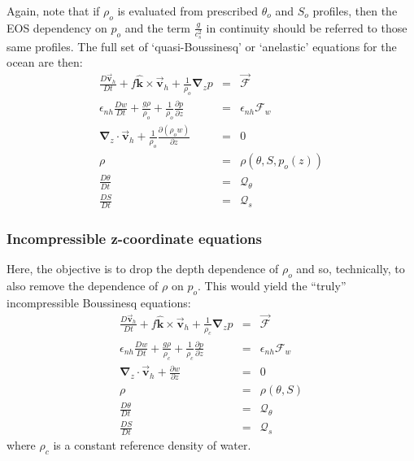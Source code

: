 Again, note that if $\rho _{o}$ is evaluated from prescribed $\theta _{o}$
and $S_{o}$ profiles, then the EOS dependency on $p_{o}$ and the term $\frac{
g}{c_{s}^{2}}$ in continuity should be referred to those same profiles. The
full set of `quasi-Boussinesq' or `anelastic' equations for the ocean are
then: 
\begin{eqnarray}
\frac{D\vec{\mathbf{v}}_{h}}{Dt}+f\hat{\mathbf{k}}\times \vec{\mathbf{v}}
_{h}+\frac{1}{\rho _{o}}\mathbf{\nabla }_{z}p &=&\vec{\mathbf{\mathcal{F}}}
\label{eq-zab-hmom} \\
\epsilon _{nh}\frac{Dw}{Dt}+\frac{g\rho }{\rho _{o}}+\frac{1}{\rho _{o}}
\frac{\partial p}{\partial z} &=&\epsilon _{nh}\mathcal{F}_{w}
\label{eq-zab-hydro} \\
\mathbf{\nabla }_{z}\cdot \vec{\mathbf{v}}_{h}+\frac{1}{\rho _{o}}\frac{
\partial \left( \rho _{o}w\right) }{\partial z} &=&0  \label{eq-zab-cont} \\
\rho &=&\rho (\theta ,S,p_{o}(z))  \label{eq-zab-eos} \\
\frac{D\theta }{Dt} &=&\mathcal{Q}_{\theta }  \label{eq-zab-heat} \\
\frac{DS}{Dt} &=&\mathcal{Q}_{s}  \label{eq-zab-salt}
\end{eqnarray}

\subsubsection{Incompressible z-coordinate equations}

Here, the objective is to drop the depth dependence of $\rho _{o}$ and so,
technically, to also remove the dependence of $\rho $ on $p_{o}$. This would
yield the ``truly'' incompressible Boussinesq equations: 
\begin{eqnarray}
\frac{D\vec{\mathbf{v}}_{h}}{Dt}+f\hat{\mathbf{k}}\times \vec{\mathbf{v}}
_{h}+\frac{1}{\rho _{c}}\mathbf{\nabla }_{z}p &=&\vec{\mathbf{\mathcal{F}}}
\label{eq-ztb-hmom} \\
\epsilon _{nh}\frac{Dw}{Dt}+\frac{g\rho }{\rho _{c}}+\frac{1}{\rho _{c}}
\frac{\partial p}{\partial z} &=&\epsilon _{nh}\mathcal{F}_{w}
\label{eq-ztb-hydro} \\
\mathbf{\nabla }_{z}\cdot \vec{\mathbf{v}}_{h}+\frac{\partial w}{\partial z}
&=&0  \label{eq-ztb-cont} \\
\rho &=&\rho (\theta ,S)  \label{eq-ztb-eos} \\
\frac{D\theta }{Dt} &=&\mathcal{Q}_{\theta }  \label{eq-ztb-heat} \\
\frac{DS}{Dt} &=&\mathcal{Q}_{s}  \label{eq-ztb-salt}
\end{eqnarray}
where $\rho _{c}$ is a constant reference density of water.

